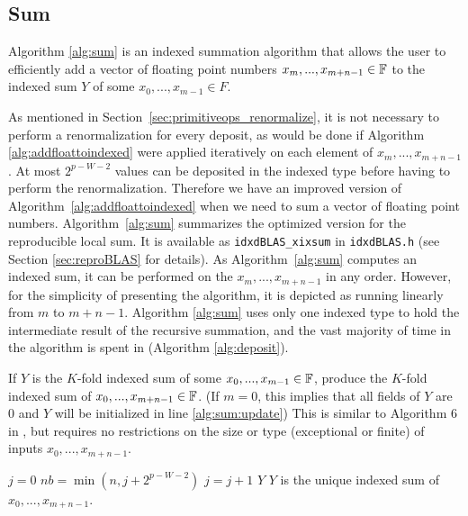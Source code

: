 \subsection{Sum}
  \label{sec:primitiveops_sum}
    Algorithm \ref{alg:sum} is an indexed summation algorithm that allows the user to efficiently add a vector of floating point numbers $x_m, ..., x_{m + n - 1} \in \mathbb{F}$ to the indexed sum $Y$ of some $x_0, ..., x_{m - 1} \in F$.

    As mentioned in Section~\ref{sec:primitiveops_renormalize}, it is not necessary to perform
    a renormalization for every deposit, as would be done if Algorithm \ref{alg:addfloattoindexed} were applied iteratively on each element of $x_m, ..., x_{m + n -1}$. At most $2^{p-W-2}$ values can be deposited in the indexed type before having to perform the renormalization.
    Therefore we have an improved version of Algorithm~\ref{alg:addfloattoindexed} when we need to sum a vector of floating point numbers.
    Algorithm~\ref{alg:sum} summarizes the optimized version for the reproducible local sum. It is available as \texttt{idxdBLAS\_xixsum} in \texttt{idxdBLAS.h} (see Section \ref{sec:reproBLAS} for details).
    As Algorithm~\ref{alg:sum} computes an indexed sum, it can be performed on the $x_m, ..., x_{m + n - 1}$ in any order. However, for the simplicity of presenting the algorithm, it is depicted as running linearly from $m$ to $m + n -1$.
    Algorithm \ref{alg:sum} uses only one indexed type to hold the intermediate result of the recursive summation, and the vast majority of time in the algorithm is spent in  (Algorithm \ref{alg:deposit}).

    \begin{samepage}
    \begin{alg}
      If $Y$ is the $K$-fold indexed sum of some $x_0, ..., x_{m - 1} \in \mathbb{F}$, produce the $K$-fold indexed sum of $x_0, ..., x_{m + n - 1} \in \mathbb{F}$. (If $m = 0$, this implies that all fields of $Y$ are 0 and $Y$ will be initialized in line \ref{alg:sum:update})
      This is similar to Algorithm $6$ in \cite{repsum}, but requires no restrictions on the size or type (exceptional or finite) of inputs $x_0, ..., x_{m + n - 1}$.
      \begin{algorithmic}[1]
          \State $j = 0$ \label{alg:sum:setj}
          \label{alg:sum:outerloop}
            \State $nb = \min(n, j + 2^{p - W - 2})$ \label{alg:sum:nb}
            \State {}\label{alg:sum:update}
              \State {}\label{alg:sum:deposit}
              \State $j = j + 1$
            \EndWhile
            \State {}\label{alg:sum:renorm}
          \EndWhile
          \State \Return $Y$
        \EndFunction
        \Ensure
        \Statex $Y$ is the unique indexed sum of $x_0, ..., x_{m + n - 1}$.
      \end{algorithmic}
      \label{alg:sum}
    \end{alg}
    \end{samepage}

